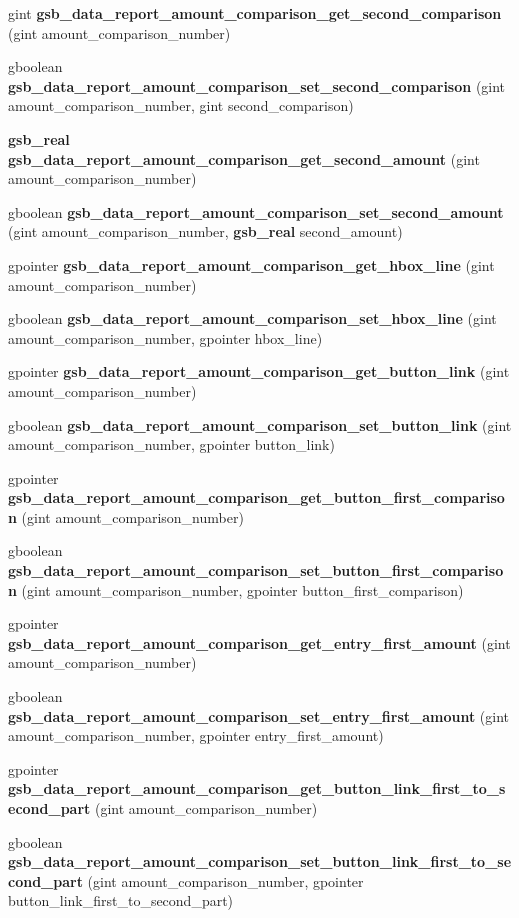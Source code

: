 \begin{DoxyCompactItemize}
\item 
gint {\bf gsb\_\-data\_\-report\_\-amount\_\-comparison\_\-get\_\-second\_\-comparison} (gint amount\_\-comparison\_\-number)
\item 
gboolean {\bf gsb\_\-data\_\-report\_\-amount\_\-comparison\_\-set\_\-second\_\-comparison} (gint amount\_\-comparison\_\-number, gint second\_\-comparison)
\item 
{\bf gsb\_\-real} {\bf gsb\_\-data\_\-report\_\-amount\_\-comparison\_\-get\_\-second\_\-amount} (gint amount\_\-comparison\_\-number)
\item 
gboolean {\bf gsb\_\-data\_\-report\_\-amount\_\-comparison\_\-set\_\-second\_\-amount} (gint amount\_\-comparison\_\-number, {\bf gsb\_\-real} second\_\-amount)
\item 
gpointer {\bf gsb\_\-data\_\-report\_\-amount\_\-comparison\_\-get\_\-hbox\_\-line} (gint amount\_\-comparison\_\-number)
\item 
gboolean {\bf gsb\_\-data\_\-report\_\-amount\_\-comparison\_\-set\_\-hbox\_\-line} (gint amount\_\-comparison\_\-number, gpointer hbox\_\-line)
\item 
gpointer {\bf gsb\_\-data\_\-report\_\-amount\_\-comparison\_\-get\_\-button\_\-link} (gint amount\_\-comparison\_\-number)
\item 
gboolean {\bf gsb\_\-data\_\-report\_\-amount\_\-comparison\_\-set\_\-button\_\-link} (gint amount\_\-comparison\_\-number, gpointer button\_\-link)
\item 
gpointer {\bf gsb\_\-data\_\-report\_\-amount\_\-comparison\_\-get\_\-button\_\-first\_\-comparison} (gint amount\_\-comparison\_\-number)
\item 
gboolean {\bf gsb\_\-data\_\-report\_\-amount\_\-comparison\_\-set\_\-button\_\-first\_\-comparison} (gint amount\_\-comparison\_\-number, gpointer button\_\-first\_\-comparison)
\item 
gpointer {\bf gsb\_\-data\_\-report\_\-amount\_\-comparison\_\-get\_\-entry\_\-first\_\-amount} (gint amount\_\-comparison\_\-number)
\item 
gboolean {\bf gsb\_\-data\_\-report\_\-amount\_\-comparison\_\-set\_\-entry\_\-first\_\-amount} (gint amount\_\-comparison\_\-number, gpointer entry\_\-first\_\-amount)
\item 
gpointer {\bf gsb\_\-data\_\-report\_\-amount\_\-comparison\_\-get\_\-button\_\-link\_\-first\_\-to\_\-second\_\-part} (gint amount\_\-comparison\_\-number)
\item 
gboolean {\bf gsb\_\-data\_\-report\_\-amount\_\-comparison\_\-set\_\-button\_\-link\_\-first\_\-to\_\-second\_\-part} (gint amount\_\-comparison\_\-number, gpointer button\_\-link\_\-first\_\-to\_\-second\_\-part)

\end{DoxyCompactItemize}
